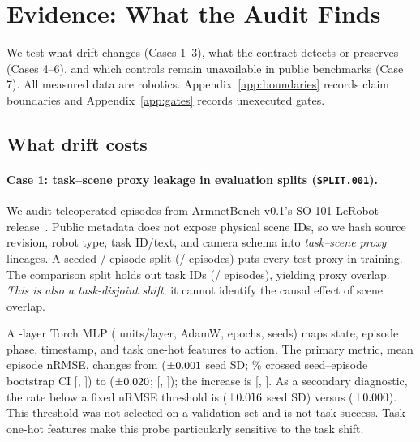 \section{Evidence: What the Audit Finds}
\label{sec:evidence}

We test what drift changes (Cases 1--3), what the contract detects or preserves (Cases 4--6), and
which controls remain unavailable in \ExpBenchmarkCount{} public benchmarks (Case 7). All measured data are
robotics. Appendix~\ref{app:boundaries} records claim boundaries and Appendix~\ref{app:gates}
records unexecuted gates.

\subsection{What drift costs}

\paragraph{Case 1: task--scene proxy leakage in evaluation splits (\texttt{SPLIT.001}).}
We audit \ExpSceneEpisodeCount{} teleoperated episodes from ArmnetBench v0.1's SO-101 LeRobot
release~\citep{armnetbench_lerobot_so101}. Public metadata does not expose physical scene IDs, so we
hash source revision, robot type, task ID/text, and camera schema into
\ExpSceneLineageCount{} \emph{task--scene proxy} lineages. A seeded
\ExpSceneRandomTrainPercent/\ExpSceneRandomTestPercent{} episode split
(\ExpSceneRandomTrainEpisodes/\ExpSceneRandomTestEpisodes{} episodes) puts every test proxy in
training. The comparison split holds out task IDs \ExpSceneHeldoutTaskIndices{}
(\ExpSceneHeldoutTrainEpisodes/\ExpSceneHeldoutTestEpisodes{} episodes), yielding
\ExpSceneHeldoutOverlap{} proxy overlap.
\emph{This is also a task-disjoint shift}; it cannot identify the causal effect of scene overlap.

A \ExpMlpLayerCount-layer Torch MLP (\ExpMlpHiddenUnits{} units/layer, AdamW,
\ExpMlpEpochCount{} epochs, \ExpMlpSeedCount{} seeds) maps state, episode phase, timestamp, and task
one-hot features to action. The primary metric, mean episode nRMSE, changes from
\ExpMlpRandomNrmse{} ($\pm0.001$ seed SD;
\ExpConfidencePercent\% crossed seed--episode bootstrap CI
[\ExpMlpRandomNrmseCiLow, \ExpMlpRandomNrmseCiHigh]) to \ExpMlpHeldoutNrmse{}
($\pm0.020$;
[\ExpMlpHeldoutNrmseCiLow, \ExpMlpHeldoutNrmseCiHigh]); the increase is
\ExpMlpNrmseDifference{} [\ExpMlpNrmseDifferenceCiLow, \ExpMlpNrmseDifferenceCiHigh].
As a secondary diagnostic, the rate below a fixed \ExpOfflineSuccessThreshold{} nRMSE threshold is
\ExpMlpRandomSuccessRate{} ($\pm0.016$ seed SD) versus
\ExpMlpHeldoutSuccessRate{} ($\pm0.000$). This threshold was not selected on
a validation set and is not task success. Task one-hot features make this probe particularly
sensitive to the task shift.

